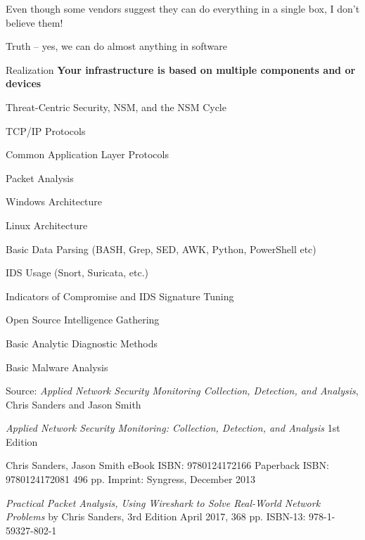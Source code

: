 \documentclass[Screen16to9,17pt]{foils}
\begin{document}
\begin{list2}
\item Even though some vendors suggest they can do everything in a single box, I don't believe them!
\item Truth -- yes, we can do almost anything in software
\item Realization {\bf Your infrastructure is based on multiple components and or devices}
\end{list2}




\begin{list2}\small
\item Threat-Centric Security, NSM, and the NSM Cycle
\item TCP/IP Protocols
\item Common Application Layer Protocols
\item Packet Analysis
\item Windows Architecture
\item Linux Architecture
\item Basic Data Parsing (BASH, Grep, SED, AWK, Python, PowerShell etc)
\item IDS Usage (Snort, Suricata, etc.)
\item Indicators of Compromise and IDS Signature Tuning
\item Open Source Intelligence Gathering
\item Basic Analytic Diagnostic Methods
\item Basic Malware Analysis
\end{list2}

Source: \emph{Applied Network Security Monitoring Collection, Detection, and Analysis},\\
Chris Sanders and Jason Smith



\emph{Applied Network Security Monitoring: Collection, Detection, and Analysis}
1st Edition

Chris Sanders, Jason Smith
eBook ISBN: 9780124172166
Paperback ISBN: 9780124172081 496 pp.
Imprint: Syngress, December 2013



\emph{Practical Packet Analysis,
Using Wireshark to Solve Real-World Network Problems}
by Chris Sanders, 3rd Edition
April 2017, 368 pp.
ISBN-13:
978-1-59327-802-1
\end{document}
